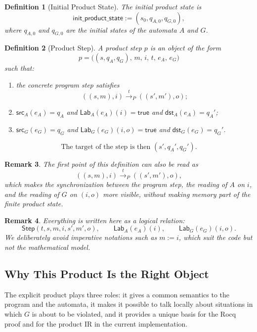 \documentclass[11pt,a4paper]{article}
\newtheorem{definition}{Definition}[section]
\newtheorem{remark}[definition]{Remark}
\newcommand{\True}{\mathsf{true}}
\newcommand{\StepRel}{\mathsf{Step}}
\begin{document}
\begin{definition}[Initial Product State]
The initial product state is
\[
\mathsf{init\_product\_state} := (s_0,q_{A,0},q_{G,0}),
\]
where \(q_{A,0}\) and \(q_{G,0}\) are the initial states of the automata
\(A\) and \(G\).
\end{definition}

\begin{definition}[Product Step]
A product step \(p\) is an object of the form
\[
p = \bigl((s,q_A,q_G),\, m,\, i,\, t,\, e_A,\, e_G \bigr)
\]
such that:
\begin{enumerate}[leftmargin=1.4em]
\item the concrete program step satisfies
  \[
  ((s,m),i)\xrightarrow{\,t\,}_P((s',m'),o);
  \]
\item \(\mathsf{src}_A(e_A)=q_A\) and \(\mathsf{Lab}_A(e_A)(i)=\True\) and
  \(\mathsf{dst}_A(e_A)=q_A'\);
\item \(\mathsf{src}_G(e_G)=q_G\) and \(\mathsf{Lab}_G(e_G)(i,o)=\True\) and
  \(\mathsf{dst}_G(e_G)=q_G'\).
\end{enumerate}
\[
\text{The target of the step is then } (s',q_A',q_G').
\]
\end{definition}

\begin{remark}
The first point of this definition can also be read as
\[
((s,m),i)\xrightarrow{\,t\,}_P((s',m'),o),
\]
which makes the synchronization between the program step, the reading of \(A\)
on \(i\), and the reading of \(G\) on \((i,o)\) more visible, without making
memory part of the finite product state.
\end{remark}

\begin{remark}
Everything is written here as a logical relation:
\[
\StepRel(t,s,m,i,s',m',o),
\qquad
\mathsf{Lab}_A(e_A)(i),
\qquad
\mathsf{Lab}_G(e_G)(i,o).
\]
We deliberately avoid imperative notations such as \(m := i\), which suit the
code but not the mathematical model.
\end{remark}

\subsection{Why This Product Is the Right Object}

The explicit product plays three roles: it gives a common semantics to the
program and the automata, it makes it possible to talk locally about
situations in which \(G\) is about to be violated, and it provides a unique
basis for the Rocq proof and for the product IR in the current implementation.
\end{document}
